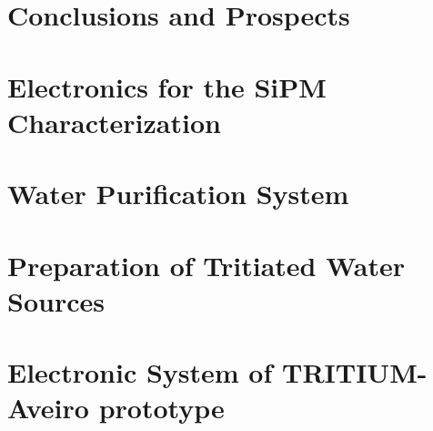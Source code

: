 \documentclass[12pt,a4paper]{book}
\begin{document}
\chapter{Conclusions and Prospects}  \label{chap:Conclusions}

\newpage

%


\appendix
\appendixpage
\noappendicestocpagenum
\addappheadtotoc

\chapter{Electronics for the SiPM Characterization}\label{App:ElectronicReadoutSiPM}


\chapter{Water Purification System}\label{App:UltraPureWaterSystem}


\chapter{Preparation of Tritiated Water Sources}\label{App:TritiumSourcePreparation}


\chapter{Electronic System of TRITIUM-Aveiro prototype}\label{App:ElectronicSystemAveiro}


%

%




\end{document}
